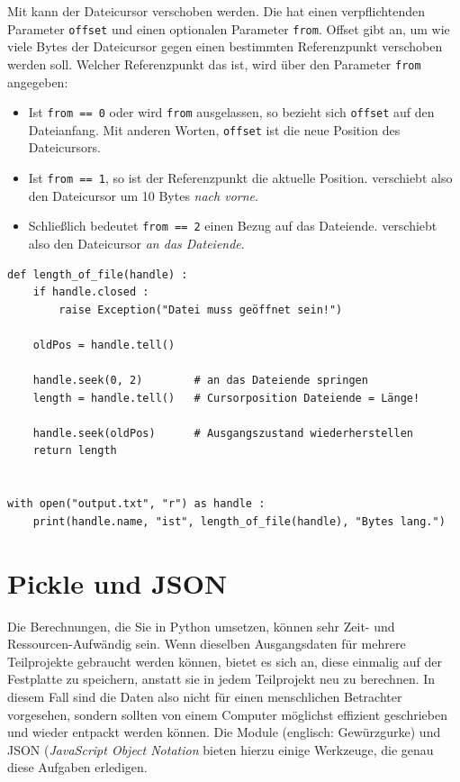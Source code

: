 Mit  kann der Dateicursor verschoben werden. Die hat einen verpflichtenden Parameter \texttt{offset} und einen optionalen Parameter \texttt{from}. Offset gibt an, um wie viele Bytes der Dateicursor gegen einen bestimmten Referenzpunkt verschoben werden soll. Welcher Referenzpunkt das ist, wird über den Parameter \texttt{from} angegeben:
\begin{itemize}
\item Ist \texttt{from == 0} oder wird \texttt{from} ausgelassen, so bezieht sich \texttt{offset} auf den Dateianfang. Mit anderen Worten, \texttt{offset} ist die neue Position des Dateicursors.
\item Ist \texttt{from == 1}, so ist der Referenzpunkt die aktuelle Position.  verschiebt also den Dateicursor um 10 Bytes \emph{nach vorne}.
\item Schließlich bedeutet \texttt{from == 2} einen Bezug auf das Dateiende.  verschiebt also den Dateicursor \emph{an das Dateiende}.
\end{itemize}

\begin{codebox}
\begin{verbatim}
def length_of_file(handle) :
    if handle.closed :
        raise Exception("Datei muss geöffnet sein!")
    
    oldPos = handle.tell()
    
    handle.seek(0, 2)        # an das Dateiende springen
    length = handle.tell()   # Cursorposition Dateiende = Länge!
    
    handle.seek(oldPos)      # Ausgangszustand wiederherstellen
    return length


with open("output.txt", "r") as handle :
    print(handle.name, "ist", length_of_file(handle), "Bytes lang.")
\end{verbatim}
\end{codebox}



\section{Pickle und JSON}
Die Berechnungen, die Sie in Python umsetzen, können sehr Zeit- und Ressourcen-Aufwändig sein. Wenn dieselben Ausgangsdaten für mehrere Teilprojekte gebraucht werden können, bietet es sich an, diese einmalig auf der Festplatte zu speichern, anstatt sie in jedem Teilprojekt neu zu berechnen. In diesem Fall sind die Daten also nicht für einen menschlichen Betrachter vorgesehen, sondern sollten von einem Computer möglichst effizient geschrieben und wieder entpackt werden können. Die Module  (englisch: Gewürzgurke) und JSON (\emph{JavaScript Object Notation} bieten hierzu einige Werkzeuge, die genau diese Aufgaben erledigen.

